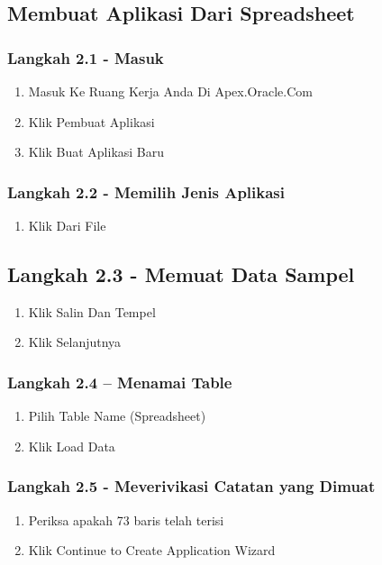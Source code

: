 \documentclass{article}
\begin{document}
\subsection{Membuat Aplikasi Dari Spreadsheet}
\subsubsection{Langkah 2.1 - Masuk}
\begin{enumerate}
    \item Masuk Ke Ruang Kerja Anda Di Apex.Oracle.Com
    \item Klik Pembuat Aplikasi
    \item Klik Buat Aplikasi Baru
    \end{enumerate}
\subsubsection{Langkah 2.2 - Memilih Jenis Aplikasi}
\begin{enumerate}
    \item Klik Dari File
    \end{enumerate}
\subsection{Langkah 2.3 - Memuat Data Sampel}
\begin{enumerate}
    \item Klik Salin Dan Tempel
    \item Klik Selanjutnya
    \end{enumerate}
\subsubsection{Langkah 2.4 – Menamai Table}
\begin{enumerate}
    \item Pilih Table Name (Spreadsheet)
    \item Klik Load Data
    \end{enumerate}
\subsubsection{Langkah 2.5  - Meverivikasi Catatan yang Dimuat}
\begin{enumerate}
    \item Periksa apakah 73 baris telah terisi
    \item Klik Continue to Create Application Wizard
    \end{enumerate}
\end{document}
